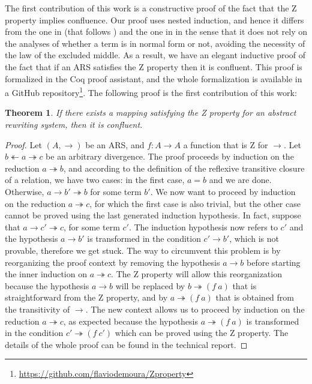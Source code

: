 \documentclass[a4paper]{article}
\newcommand{\tto}{\twoheadrightarrow}
\newcommand{\ott}{\twoheadleftarrow}
\newtheorem{theorem}{Theorem}[section]
\begin{document}
The first contribution of this work is a constructive proof of the
fact that the Z property implies confluence. Our proof uses nested
induction, and hence it differs from the one in \cite{kesnerTheoryExplicitSubstitutions2009} (that
follows \cite{dehornoy2008z}) and the one in \cite{felgenhauerProperty2016} in the
sense that it does not rely on the analyses of whether a term is in
normal form or not, avoiding the necessity of the law of the excluded
middle. As a result, we have an elegant inductive proof of the fact
that if an ARS satisfies the Z property then it is confluent. This
proof is formalized in the Coq proof assistant, and the whole
formalization is available in a GitHub
repository\footnote{\label{fn:github}\url{https://github.com/flaviodemoura/Zproperty}}. The
following proof is the first contribution of this work:
\begin{theorem}\cite{dehornoy2008z}
  If there exists a mapping satisfying the Z property for an abstract
  rewriting system, then it is confluent.
\end{theorem}
\begin{proof}
  Let $(A,\to)$ be an ARS, and $f: A \to A$ a function that is Z for
  $\to$. Let $b \ott a \tto c$ be an arbitrary divergence. The proof
  proceeds by induction on the reduction $a \tto b$, and according to
  the definition of the reflexive transitive closure of a relation, we
  have two cases: in the first case, $a=b$ and we are done. Otherwise,
  $a \to b' \tto b$ for some term $b'$. We now want to proceed by
  induction on the reduction $a \tto c$, for which the first case is
  also trivial, but the other case cannot be proved using the last
  generated induction hypothesis. In fact, suppose that
  $a \to c' \tto c$, for some term $c'$. The induction hypothesis now
  refers to $c'$ and the hypothesis $a \to b'$ is transformed in the
  condition $c' \to b'$, which is not provable, therefore we get
  stuck. The way to circumvent this problem is by reorganizing the
  proof context by removing the hypothesis $a \to b$ before starting
  the inner induction on $a \tto c$. The Z property will allow this
  reorganization because the hypothesis $a \to b$ will be replaced by
  $b \tto (f\ a)$ that is straightforward from the Z property, and by
  $a \tto (f\ a)$ that is obtained from the transitivity of $\to$. The
  new context allows us to proceed by induction on the reduction
  $a \tto c$, as expected because the hypothesis $a \tto (f\ a)$ is
  transformed in the condition $c' \tto (f\ c')$ which can be proved
  using the Z property. The details of the whole proof can be found in
  the technical report\cite{reportZtoConfl}.
\end{proof}
  
\end{document}

